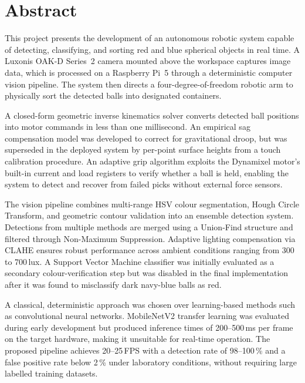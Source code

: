 \clearpage
\thispagestyle{empty}
{}
\section*{Abstract}

\vspace{0.5cm}

This project presents the development of an autonomous robotic system capable of 
detecting, classifying, and sorting red and blue spherical objects in real time. 
A Luxonis OAK-D Series~2 camera mounted above the workspace captures image data, 
which is processed on a Raspberry Pi~5 through a deterministic computer vision 
pipeline. The system then directs a four-degree-of-freedom robotic arm to physically sort the 
detected balls into designated containers.

\vspace{0.4cm}

A closed-form geometric inverse kinematics solver converts
detected ball positions into motor commands in less than one
millisecond. An empirical sag compensation model was developed
to correct for gravitational droop, but was superseded in the
deployed system by per-point surface heights from a touch
calibration procedure. An adaptive grip algorithm exploits the
Dynamixel motor's built-in current and load registers to verify
whether a ball is held, enabling the system to detect and
recover from failed picks without external force sensors.

\vspace{0.4cm}

The vision pipeline combines multi-range HSV colour segmentation, Hough Circle 
Transform, and geometric contour validation into an ensemble detection system. 
Detections from multiple methods are merged using a Union-Find structure and 
filtered through Non-Maximum Suppression. Adaptive lighting compensation via 
CLAHE ensures robust performance across ambient conditions ranging from 
300 to 700\,lux. A Support Vector Machine classifier was initially evaluated 
as a secondary colour-verification step but was disabled in the final 
implementation after it was found to misclassify dark navy-blue balls as red.

\vspace{0.4cm}

A classical, deterministic approach was chosen over learning-based methods such 
as convolutional neural networks. MobileNetV2 transfer learning was evaluated 
during early development but produced inference times of 200--500\,ms per frame 
on the target hardware, making it unsuitable for real-time operation. The 
proposed pipeline achieves 20--25\,FPS with a detection rate of 98--100\,\% 
and a false positive rate below 2\,\% under laboratory conditions, without 
requiring large labelled training datasets.

